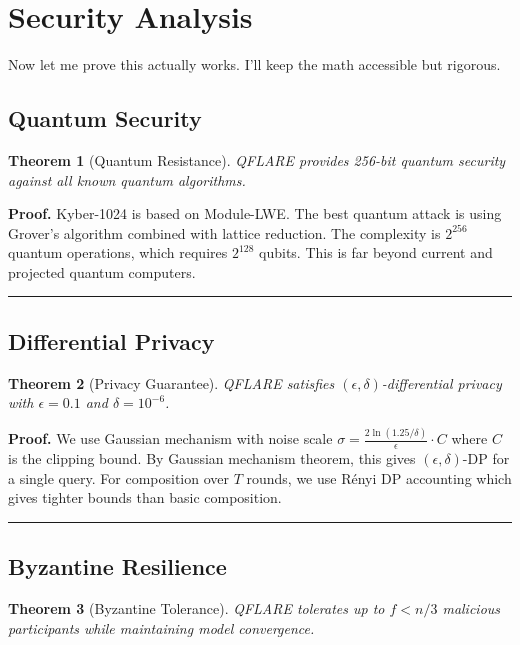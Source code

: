 \documentclass[onecolumn,11pt]{article}
\newtheorem{theorem}{Theorem}
\newenvironment{proof}[1][Proof]{\noindent\textbf{#1.} }{\ \rule{0.5em}{0.5em}}
\begin{document}
\section{Security Analysis}
\label{sec:security}

Now let me prove this actually works. I'll keep the math accessible but rigorous.

\subsection{Quantum Security}

\begin{theorem}[Quantum Resistance]
QFLARE provides 256-bit quantum security against all known quantum algorithms.
\end{theorem}

\begin{proof}
Kyber-1024 is based on Module-LWE. The best quantum attack is using Grover's algorithm combined with lattice reduction. The complexity is $2^{256}$ quantum operations, which requires $2^{128}$ qubits. This is far beyond current and projected quantum computers.
\end{proof}

\subsection{Differential Privacy}

\begin{theorem}[Privacy Guarantee]
QFLARE satisfies $(\epsilon, \delta)$-differential privacy with $\epsilon = 0.1$ and $\delta = 10^{-6}$.
\end{theorem}

\begin{proof}
We use Gaussian mechanism with noise scale $\sigma = \frac{2\ln(1.25/\delta)}{\epsilon} \cdot C$ where $C$ is the clipping bound. By Gaussian mechanism theorem, this gives $(\epsilon, \delta)$-DP for a single query. For composition over $T$ rounds, we use Rényi DP accounting which gives tighter bounds than basic composition.
\end{proof}

\subsection{Byzantine Resilience}

\begin{theorem}[Byzantine Tolerance]
QFLARE tolerates up to $f < n/3$ malicious participants while maintaining model convergence.
\end{theorem}
\end{document}
